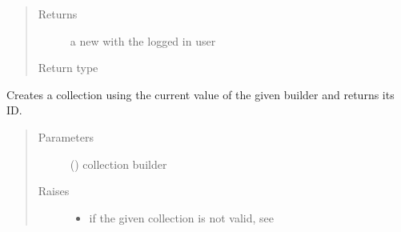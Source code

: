 \documentclass[letterpaper,10pt,english]{sphinxmanual}
\begin{document}
\begin{fulllineitems}
\begin{fulllineitems}
\begin{quote}
\begin{description}
\item[{Returns}] \leavevmode
\sphinxAtStartPar
a new {\hyperref[\detokenize{autoapi/pine/client/models/index:pine.client.models.CollectionBuilder}]{}} with the logged in user

\item[{Return type}] \leavevmode
\sphinxAtStartPar
{\hyperref[\detokenize{autoapi/pine/client/models/index:pine.client.models.CollectionBuilder}]{}}

\end{description}\end{quote}

\end{fulllineitems}


\begin{fulllineitems}
\label{\detokenize{autoapi/pine/client/index:pine.client.PineClient.create_collection}}
\sphinxAtStartPar
Creates a collection using the current value of the given builder and returns its ID.
\begin{quote}\begin{description}
\item[{Parameters}] \leavevmode
\sphinxAtStartPar
{} ({\hyperref[\detokenize{autoapi/pine/client/models/index:pine.client.models.CollectionBuilder}]{}}) \textendash{} collection builder

\item[{Raises}] \leavevmode\begin{itemize}
\item {} 
\sphinxAtStartPar
{\hyperref[\detokenize{autoapi/pine/client/exceptions/index:pine.client.exceptions.PineClientValueException}]{}} \textendash{} if the given collection is not valid, see {\hyperref[\detokenize{autoapi/pine/client/models/index:pine.client.models.is_valid_collection}]{}}


\end{itemize}
\end{description}
\end{quote}
\end{fulllineitems}
\end{fulllineitems}
\end{document}
